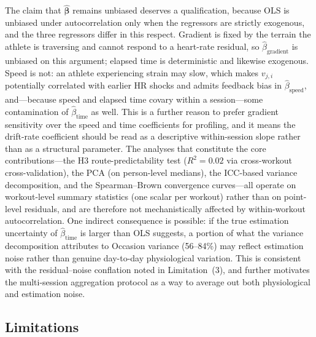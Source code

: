 \documentclass[times, twoside]{zHenriquesLab-StyleBioRxiv}
\begin{document}
The claim that $\hat{\boldsymbol{\beta}}$ remains unbiased deserves a qualification, because OLS is unbiased under autocorrelation only when the regressors are strictly exogenous, and the three regressors differ in this respect. Gradient is fixed by the terrain the athlete is traversing and cannot respond to a heart-rate residual, so $\hat{\beta}_{\text{gradient}}$ is unbiased on this argument; elapsed time is deterministic and likewise exogenous. Speed is not: an athlete experiencing strain may slow, which makes $v_{j,i}$ potentially correlated with earlier HR shocks and admits feedback bias in $\hat{\beta}_{\text{speed}}$, and---because speed and elapsed time covary within a session---some contamination of $\hat{\beta}_{\text{time}}$ as well. This is a further reason to prefer gradient sensitivity over the speed and time coefficients for profiling, and it means the drift-rate coefficient should be read as a descriptive within-session slope rather than as a structural parameter. The analyses that constitute the core contributions---the H3 route-predictability test ($R^2 = 0.02$ via cross-workout cross-validation), the PCA (on person-level medians), the ICC-based variance decomposition, and the Spearman--Brown convergence curves---all operate on workout-level summary statistics (one scalar per workout) rather than on point-level residuals, and are therefore not mechanistically affected by within-workout autocorrelation. One indirect consequence is possible: if the true estimation uncertainty of $\hat{\beta}_{\text{time}}$ is larger than OLS suggests, a portion of what the variance decomposition attributes to Occasion variance (56--84\%) may reflect estimation noise rather than genuine day-to-day physiological variation. This is consistent with the residual--noise conflation noted in Limitation~(3), and further motivates the multi-session aggregation protocol as a way to average out both physiological and estimation noise.

\subsection*{Limitations}
\end{document}

